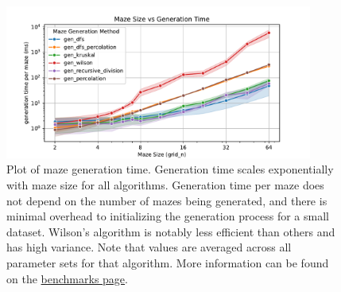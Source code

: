 \begin{figure}
	\hypertarget{fig:benchmarks}{%
	\centering
	\includegraphics[width=0.9\textwidth,height=\textheight]{figures/benchmarks/gridsize-vs-gentime.pdf}
	\caption{Plot of maze generation time. Generation time scales
	exponentially with maze size for all algorithms. Generation time per
	maze does not depend on the number of mazes being generated, and there
	is minimal overhead to initializing the generation process for a small
	dataset. Wilson's algorithm is notably less efficient than others and
	has high variance. Note that values are averaged across all parameter
	sets for that algorithm. More information can be found on the
	\href{https://understanding-search.github.io/maze-dataset/benchmarks/}{benchmarks
	page}.}\label{fig:benchmarks}
	}
\end{figure}